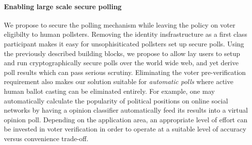 \paragraph{Enabling large scale secure polling}
We propose to secure the polling mechanism while leaving the policy on voter eligibilty
to human pollsters.  Removing the identity insfrastructure as a first class
participant makes it easy for unsophisiticated pollsters set up secure polls. 
Using the previously described building blocks, we propose to allow
lay users to setup and run cryptographically secure polls over the world wide
web, and yet derive poll results which can pass serious scrutiny.
Eliminating the voter pre-verification requirement also makes our solution
suitable for \emph{automatic polls} where active human ballot casting can be eliminated entirely.
For example,
one may automatically calculate the
popularity of political positions on online social networks by having a
opinion classifier automatically feed its results into a virtual opinion poll.
Depending on the application area, an appropriate level of effort can be invested in
voter verification in order to operate at a suitable level of accuracy versus
convenience trade-off.  





